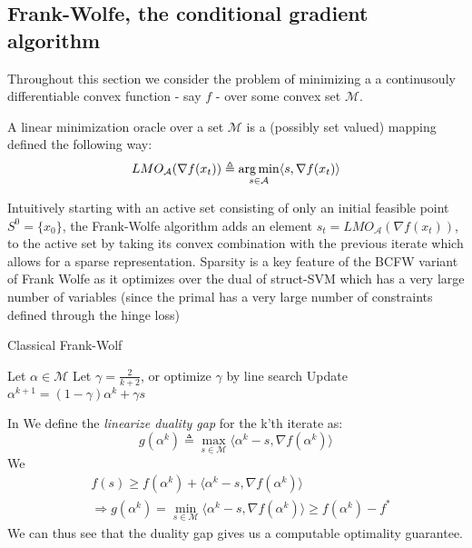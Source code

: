 \subsection{Frank-Wolfe, the conditional gradient algorithm}
Throughout this section we consider the problem of minimizing a
a continusouly differentiable convex function - say $f$ - over some convex set
$\mathcal M$.
\begin{definition}
  A linear minimization oracle over a set $\mathcal M$ is a (possibly set
valued) mapping defined the following way:
  \begin{equation}
    LMO_{\mathcal{A}}(\nabla f(x_{t})) \triangleq
    \operatorname*{\arg\min}_{s \in\mathcal{A}}\langle s, \nabla f(x_{t})\rangle
    \label{eq:lmo}
  \end{equation}
\end{definition}

Intuitively starting with an active set consisting of only an initial feasible
point $S^{0}= \{x_{0}\}$, the Frank-Wolfe algorithm adds an element $s_{t}=
LMO_{\mathcal{A}}(\nabla f(x_{t}))$, to the active set by taking its
convex combination with the previous iterate which allows for a sparse
representation. Sparsity is a key feature of the BCFW variant of Frank Wolfe as
it optimizes over the dual of struct-SVM which has a very large number of
variables (since the primal has a very large number of constraints defined
through the hinge loss)

\begin{algorithm}
  \caption{Classical Frank-Wolf}
  \label{alg:fw}
\begin{algorithmic}
   \STATE Let $\alpha\in\mathcal{M}$
   \STATE Let $\gamma = \frac{2}{k+2}$, or optimize $\gamma$ by line search
   \STATE Update $\alpha^{k+1}= (1-\gamma)\alpha^{k}+ \gamma s$
   \ENDFOR
\end{algorithmic}
\end{algorithm}

In \citet{lacoste-julienBlockCoordinateFrankWolfeOptimization2013} 
We define the \emph{linearize duality gap} for the k'th iterate as:
\begin{equation}
  g(\alpha^{k}) \triangleq \max_{s\in\mathcal{M}}\langle \alpha^{k}-s, \nabla f(\alpha^{k})\rangle
  \label{eq:dualityGapDef}
\end{equation}
We
\begin{align}
    &f(s)\geq f(\alpha^{k})+ \langle \alpha^{k}-s, \nabla f(\alpha^{k})\rangle\\
    &\Longrightarrow g(\alpha^{k})=
      \min_{s\in\mathcal{M}}\langle \alpha^{k}-s, \nabla
      f(\alpha^{k})\rangle \geq f(\alpha^{k})- f^{*}
\end{align}
We can thus see that the duality gap gives us a computable optimality guarantee. \\


